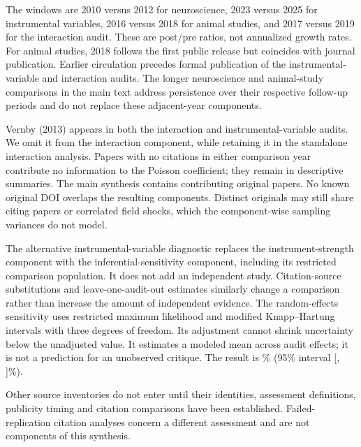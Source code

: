 \documentclass[11pt,letterpaper]{article}
\begin{document}
The windows are 2010 versus 2012 for neuroscience, 2023 versus 2025 for instrumental variables, 2016 versus 2018 for animal studies, and 2017 versus 2019 for the interaction audit. These are post/pre ratios, not annualized growth rates. For animal studies, 2018 follows the first public release but coincides with journal publication. Earlier circulation precedes formal publication of the instrumental-variable and interaction audits. The longer neuroscience and animal-study comparisons in the main text address persistence over their respective follow-up periods and do not replace these adjacent-year components.

Vernby (2013) appears in both the interaction and instrumental-variable audits. We omit it from the interaction component, while retaining it in the standalone interaction analysis. Papers with no citations in either comparison year contribute no information to the Poisson coefficient; they remain in descriptive summaries. The main synthesis contains \AuditPapers{} contributing original papers. No known original DOI overlaps the resulting components. Distinct originals may still share citing papers or correlated field shocks, which the component-wise sampling variances do not model.

The alternative instrumental-variable diagnostic replaces the instrument-strength component with the inferential-sensitivity component, including its restricted comparison population. It does not add an independent study. Citation-source substitutions and leave-one-audit-out estimates similarly change a comparison rather than increase the amount of independent evidence. The random-effects sensitivity uses restricted maximum likelihood and modified Knapp--Hartung intervals with three degrees of freedom. Its adjustment cannot shrink uncertainty below the unadjusted value. It estimates a modeled mean across audit effects; it is not a prediction for an unobserved critique. The result is \AuditReWeakPercent\% (95\% interval [\AuditReWeakLower, \AuditReWeakUpper]\%).

Other source inventories do not enter until their identities, assessment definitions, publicity timing and citation comparisons have been established. Failed-replication citation analyses concern a different assessment and are not components of this synthesis.
\end{document}
